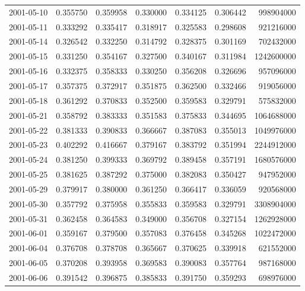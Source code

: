 \begin{tabular}{lrrrrrr}
2001-05-10 &    0.355750 &    0.359958 &    0.330000 &    0.334125 &    0.306442 &   998904000 \\
2001-05-11 &    0.333292 &    0.335417 &    0.318917 &    0.325583 &    0.298608 &   921216000 \\
2001-05-14 &    0.326542 &    0.332250 &    0.314792 &    0.328375 &    0.301169 &   702432000 \\
2001-05-15 &    0.331250 &    0.354167 &    0.327500 &    0.340167 &    0.311984 &  1242600000 \\
2001-05-16 &    0.332375 &    0.358333 &    0.330250 &    0.356208 &    0.326696 &   957096000 \\
2001-05-17 &    0.357375 &    0.372917 &    0.351875 &    0.362500 &    0.332466 &   919056000 \\
2001-05-18 &    0.361292 &    0.370833 &    0.352500 &    0.359583 &    0.329791 &   575832000 \\
2001-05-21 &    0.358792 &    0.383333 &    0.351583 &    0.375833 &    0.344695 &  1064688000 \\
2001-05-22 &    0.381333 &    0.390833 &    0.366667 &    0.387083 &    0.355013 &  1049976000 \\
2001-05-23 &    0.402292 &    0.416667 &    0.379167 &    0.383792 &    0.351994 &  2244912000 \\
2001-05-24 &    0.381250 &    0.399333 &    0.369792 &    0.389458 &    0.357191 &  1680576000 \\
2001-05-25 &    0.381625 &    0.387292 &    0.375000 &    0.382083 &    0.350427 &   947952000 \\
2001-05-29 &    0.379917 &    0.380000 &    0.361250 &    0.366417 &    0.336059 &   920568000 \\
2001-05-30 &    0.357792 &    0.375958 &    0.355833 &    0.359583 &    0.329791 &  3308904000 \\
2001-05-31 &    0.362458 &    0.364583 &    0.349000 &    0.356708 &    0.327154 &  1262928000 \\
2001-06-01 &    0.359167 &    0.379500 &    0.357083 &    0.376458 &    0.345268 &  1022472000 \\
2001-06-04 &    0.376708 &    0.378708 &    0.365667 &    0.370625 &    0.339918 &   621552000 \\
2001-06-05 &    0.370208 &    0.393958 &    0.369583 &    0.390083 &    0.357764 &   987168000 \\
2001-06-06 &    0.391542 &    0.396875 &    0.385833 &    0.391750 &    0.359293 &   698976000 \\

\end{tabular}
